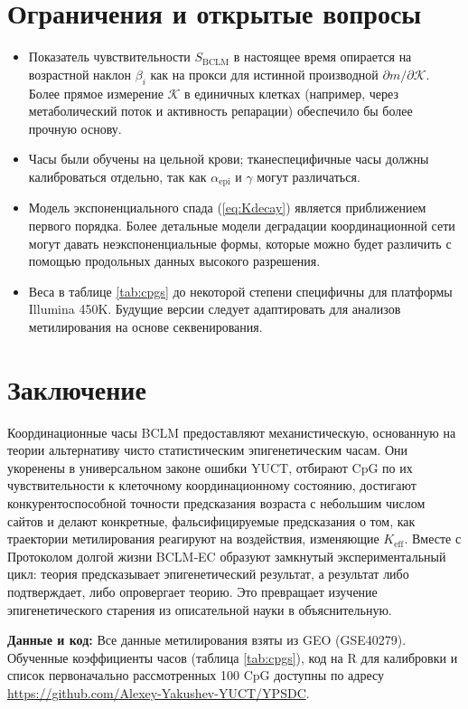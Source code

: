 \documentclass[12pt,a4paper]{article}
\newcommand{\REL}{\mathcal{K}}          %
\begin{document}
	\section{Ограничения и открытые вопросы}
	\label{sec:limitations}
	\begin{itemize}
		\item Показатель чувствительности \(S_{\mathrm{BCLM}}\) в настоящее время опирается на возрастной наклон \(\beta_i\) как на прокси для истинной производной \(\partial m/\partial \REL\). Более прямое измерение \(\REL\) в единичных клетках (например, через метаболический поток и активность репарации) обеспечило бы более прочную основу.
		\item Часы были обучены на цельной крови; тканеспецифичные часы должны калиброваться отдельно, так как \(\alpha_{\mathrm{epi}}\) и \(\gamma\) могут различаться.
		\item Модель экспоненциального спада (\ref{eq:Kdecay}) является приближением первого порядка. Более детальные модели деградации координационной сети могут давать неэкспоненциальные формы, которые можно будет различить с помощью продольных данных высокого разрешения.
		\item Веса в таблице \ref{tab:cpgs} до некоторой степени специфичны для платформы Illumina 450K. Будущие версии следует адаптировать для анализов метилирования на основе секвенирования.
	\end{itemize}
	
	\section{Заключение}
	\label{sec:conclusion}
	Координационные часы BCLM предоставляют механистическую, основанную на теории альтернативу чисто статистическим эпигенетическим часам. Они укоренены в универсальном законе ошибки YUCT, отбирают CpG по их чувствительности к клеточному координационному состоянию, достигают конкурентоспособной точности предсказания возраста с небольшим числом сайтов и делают конкретные, фальсифицируемые предсказания о том, как траектории метилирования реагируют на воздействия, изменяющие \(K_{\mathrm{eff}}\). Вместе с Протоколом долгой жизни BCLM‑EC образуют замкнутый экспериментальный цикл: теория предсказывает эпигенетический результат, а результат либо подтверждает, либо опровергает теорию. Это превращает изучение эпигенетического старения из описательной науки в объяснительную.
	
	\vspace{0.5cm}
	\noindent\textbf{Данные и код:} Все данные метилирования взяты из GEO (GSE40279). Обученные коэффициенты часов (таблица \ref{tab:cpgs}), код на R для калибровки и список первоначально рассмотренных 100 CpG доступны по адресу \url{https://github.com/Alexey-Yakushev-YUCT/YPSDC}.
	
\end{document}
